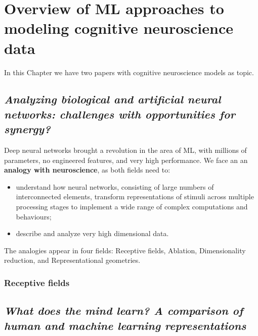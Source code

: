 \chapter{Overview of ML approaches to modeling cognitive neuroscience data}
\label{chap:overview}

In this Chapter we have two papers with cognitive neuroscience models as topic.

\section[Analyzing biological and artificial neural networks]{\textit{Analyzing biological and artificial neural networks: challenges with opportunities for synergy?}\\ \cite{BARRETT201955}}

Deep neural networks brought a revolution in the area of ML, with millions of parameters, no engineered features, and very high performance. We face an an \textbf{analogy with neuroscience}, as both fields need to:
\begin{itemize}
    \item understand how neural networks, consisting of large numbers of interconnected elements, transform representations of stimuli across multiple processing stages to implement a wide range of complex computations and behaviours;
    \item describe and analyze very high dimensional data.
\end{itemize}

The analogies appear in four fields: Receptive fields, Ablation, Dimensionality reduction, and Representational geometries.

\subsection{Receptive fields}

\section[Spatial methods, logical methods and ANNs]{\textit{What does the mind learn? A comparison of human and machine learning representations}\\ \cite{SPICER201997}}

